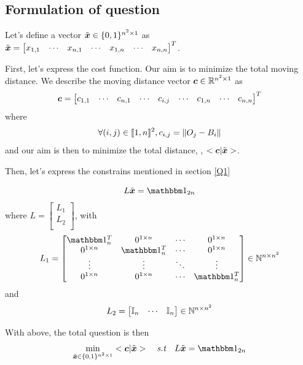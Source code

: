 \documentclass{CSArticle}[english]
\def\xtd{\tilde{\xbs}}
\begin{document}
\subsection{Formulation of question}
Let's define a vector $\xtd \in \{0,1\}^{n^2\times 1}$ as $\xtd=\left[ \begin{matrix}
	x_{1,1}&		\cdots&		x_{n,1}&		\cdots&		x_{1,n}&		\cdots&		x_{n,n}\\
\end{matrix} \right] ^T$.\par
First, let's express the cost function. Our aim is to minimize the total moving distance. We describe the moving distance vector $\boldsymbol{c}\in \mathbb{R}^{n^2\times 1}$ as
\begin{equation}
    \boldsymbol{c}=\left[ \begin{matrix}
	c_{1,1}&		\cdots&		c_{n,1}&		\cdots& c_{i,j} &	\cdots&	c_{1,n}&		\cdots&		c_{n,n}\\
\end{matrix} \right] ^T
\end{equation} where
\begin{equation}
    \forall (i,j) \in \llbracket1,n\rrbracket^2, c_{i,j}=\| O_j-B_i \|
\end{equation}
and our aim is then to minimize the total distance, \ie, $<\cbs|\xtd>$.\par
Then, let's express the constrains mentioned in section \ref{Q1}

\begin{equation}
    L\xtd=\Onebb_{2n}
\end{equation}
where $L=\left[ \begin{array}{c}
	L_1\\
	L_2\\
\end{array} \right]$, 
with
\begin{equation}
L_1=\left[ \begin{matrix}
	\Onebb_{n}^T&		0^{1\times n}&		\cdots&		0^{1\times n}\\
	0^{1\times n}&		\Onebb_{n}^T&		\cdots&		0^{1\times n}\\
	\vdots&		\vdots&		\ddots&		\vdots\\
	0^{1\times n}&		0^{1\times n}&		\cdots&		\Onebb_{n}^T\\
\end{matrix} \right] \in \mathbb{N} ^{n\times n^2}
\end{equation}
and
\begin{equation}L_2=\left[ \begin{matrix}
	\mathbb{I}_n&		\cdots&		\mathbb{I}_n\\
\end{matrix} \right] \in \mathbb{N} ^{n\times n^2}
\end{equation}\par
With above, the total question is then
\begin{equation}
    \min_{\xtd \in \{0,1\}^{n^2\times 1}} <\cbs|\xtd> \quad \st  \quad L\xtd= \Onebb_{2n}
\end{equation}
\end{document}
